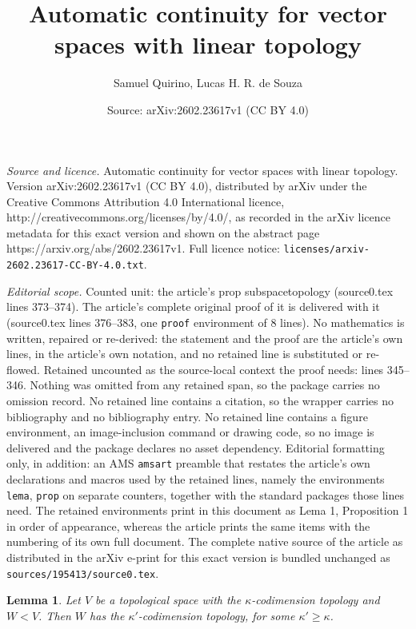 \documentclass[10pt,a4paper]{amsart}
\title{Automatic continuity for vector spaces with linear topology}
\author{Samuel Quirino, Lucas H. R. de Souza}
\date{Source: arXiv:2602.23617v1 (CC BY 4.0)}
\newtheorem{lema}{Lemma}
\begin{document}
\maketitle

\noindent\emph{Source and licence.} Automatic continuity for vector spaces with linear topology. Version arXiv:2602.23617v1 (CC BY 4.0), distributed by arXiv under the Creative Commons Attribution 4.0 International licence, http://creativecommons.org/licenses/by/4.0/, as recorded in the arXiv licence metadata for this exact version and shown on the abstract page https://arxiv.org/abs/2602.23617v1. Full licence notice: \texttt{licenses/arxiv-2602.23617-CC-BY-4.0.txt}.\par\smallskip

\noindent\textit{Editorial scope.} Counted unit: the article's prop subspacetopology (source0.tex lines 373--374). The article's complete original proof of it is delivered with it (source0.tex lines 376--383, one \texttt{proof} environment of 8 lines). No mathematics is written, repaired or re-derived: the statement and the proof are the article's own lines, in the article's own notation, and no retained line is substituted or re-flowed.  Retained uncounted as the source-local context the proof needs: lines 345--346.  Nothing was omitted from any retained span, so the package carries no omission record.  No retained line contains a citation, so the wrapper carries no bibliography and no bibliography entry.  No retained line contains a figure environment, an image-inclusion command or drawing code, so no image is delivered and the package declares no asset dependency.  Editorial formatting only, in addition: an AMS \texttt{amsart} preamble that restates the article's own declarations and macros used by the retained lines, namely the environments \texttt{lema}, \texttt{prop} on separate counters, together with the standard packages those lines need.  The retained environments print in this document as Lema 1, Proposition 1 in order of appearance, whereas the article prints the same items with the numbering of its own full document.  The complete native source of the article as distributed in the arXiv e-print for this exact version is bundled unchanged as \texttt{sources/195413/source0.tex}.
\begin{lema}\label{subspacetopology1}Let $V$ be a topological space with the $\kappa$-codimension topology and $W < V$. Then $W$ has the $\kappa'$-codimension topology, for some $\kappa' \geqslant \kappa$.
\end{lema}
\end{document}
